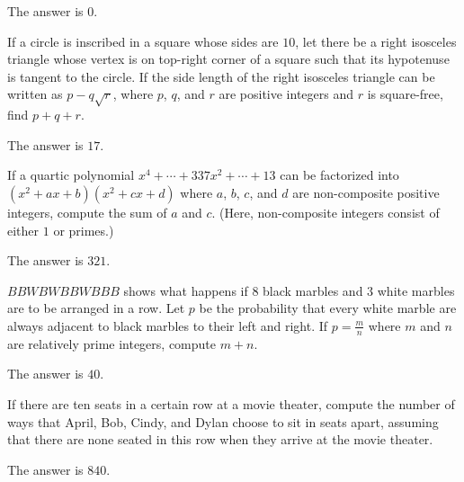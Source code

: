 \begin{solution}
The answer is $0$.
\end{solution}

\begin{problem}
If a circle is inscribed in a square whose sides are $10$, let there be a right isosceles triangle whose vertex is on top-right corner of a square such that its hypotenuse is tangent to the circle. If the side length of the right isosceles triangle can be written as $p-q\sqrt{r}$, where $p$, $q$, and $r$ are positive integers and $r$ is square-free, find $p+q+r$.
\end{problem}

\begin{solution}
The answer is $17$.
\end{solution}

\begin{problem}
If a quartic polynomial $x^4+\cdots+337x^2+\cdots+13$ can be factorized into $(x^2+ax+b)(x^2+cx+d)$ where $a$, $b$, $c$, and $d$ are non-composite positive integers, compute the sum of $a$ and $c$. (Here, non-composite integers consist of either $1$ or primes.)
\end{problem}

\begin{solution}
The answer is $321$.
\end{solution}

\begin{problem}
$BBWBWBBWBBB$ shows what happens if $8$ black marbles and $3$ white marbles are to be arranged in a row. Let $p$ be the probability that every white marble are always adjacent to black marbles to their left and right. If $p=\frac{m}{n}$ where $m$ and $n$ are relatively prime integers, compute $m+n$.
\end{problem}

\begin{solution}
The answer is $40$.
\end{solution}

\begin{problem}
If there are ten seats in a certain row at a movie theater, compute the number of ways that April, Bob, Cindy, and Dylan choose to sit in seats apart, assuming that there are none seated in this row when they arrive at the movie theater.
\end{problem}

\begin{solution}
The answer is $840$.
\end{solution}

